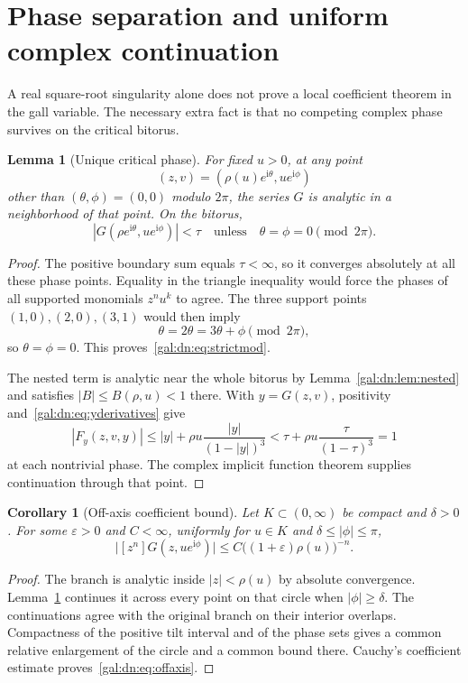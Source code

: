 \documentclass[11pt,letterpaper]{article}
\numberwithin{equation}{section}
\newtheorem{lemma}[theorem]{Lemma}
\newtheorem{corollary}[theorem]{Corollary}
\theoremstyle{definition}\newtheorem{definition}[theorem]{Definition}
\theoremstyle{remark}\newtheorem{remark}[theorem]{Remark}
\newcommand{\ii}{\mathrm i}
\newcommand{\eps}{\varepsilon}
\begin{document}
\section{Phase separation and uniform complex continuation}\label{gal:dn:sec:phase}
A real square-root singularity alone does not prove a local coefficient theorem in the gall variable. The necessary extra fact is that no competing complex phase survives on the critical bitorus.

\begin{lemma}[Unique critical phase]\label{gal:dn:lem:phase}
For fixed $u>0$, at any point
\[
 (z,v)=(\rho(u)e^{\ii\theta},u e^{\ii\phi})
\]
other than $(\theta,\phi)=(0,0)$ modulo $2\pi$, the series $G$ is analytic in a neighborhood of that point. On the bitorus,
\begin{equation}\label{gal:dn:eq:strictmod}
 |G(\rho e^{\ii\theta},ue^{\ii\phi})|<\tau
 \quad\text{unless}\quad \theta=\phi=0\pmod{2\pi}.
\end{equation}
\end{lemma}
\begin{proof}
The positive boundary sum equals $\tau<\infty$, so it converges absolutely at all these phase points. Equality in the triangle inequality would force the phases of all supported monomials $z^nu^k$ to agree. The three support points $(1,0),(2,0),(3,1)$ would then imply
\[
 \theta=2\theta=3\theta+\phi\pmod{2\pi},
\]
so $\theta=\phi=0$. This proves~\eqref{gal:dn:eq:strictmod}.

The nested term is analytic near the whole bitorus by Lemma~\ref{gal:dn:lem:nested} and satisfies $|B|\leq B(\rho,u)<1$ there. With $y=G(z,v)$, positivity and~\eqref{gal:dn:eq:yderivatives} give
\[
 |F_y(z,v,y)|\leq |y|+\rho u\frac{|y|}{(1-|y|)^3}
 <\tau+\rho u\frac{\tau}{(1-\tau)^3}=1
\]
at each nontrivial phase. The complex implicit function theorem supplies continuation through that point.
\end{proof}

\begin{corollary}[Off-axis coefficient bound]\label{gal:dn:cor:offaxis}
Let $K\subset(0,\infty)$ be compact and $\delta>0$. For some $\eps>0$ and $C<\infty$, uniformly for $u\in K$ and $\delta\leq|\phi|\leq\pi$,
\begin{equation}\label{gal:dn:eq:offaxis}
 \bigl|[z^n]G(z,ue^{\ii\phi})\bigr|
 \leq C\bigl((1+\eps)\rho(u)\bigr)^{-n}.
\end{equation}
\end{corollary}
\begin{proof}
The branch is analytic inside $|z|<\rho(u)$ by absolute convergence. Lemma~\ref{gal:dn:lem:phase} continues it across every point on that circle when $|\phi|\geq\delta$. The continuations agree with the original branch on their interior overlaps. Compactness of the positive tilt interval and of the phase sets gives a common relative enlargement of the circle and a common bound there. Cauchy's coefficient estimate proves~\eqref{gal:dn:eq:offaxis}.
\end{proof}
\end{document}
